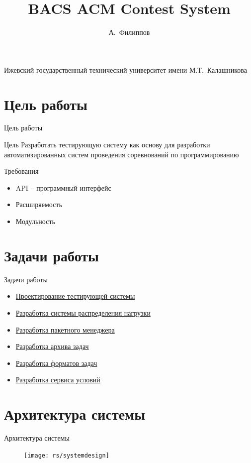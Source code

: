 \documentclass[xetex,mathserif,serif,10pt]{beamer}
\newenvironment{sframe}[2]{\section{#1}\begin{frame}[label=#2]{#1}}{\end{frame}}
\begin{document}
    \title[BACS]{BACS ACM Contest System}
    \author[Филиппов]{А.~Филиппов}
    \institute
    {
        Ижевский государственный технический университет имени М.Т.~Калашникова
    }

    

    \begin{sframe}{Цель работы}{target}
        \begin{block}{Цель}
            Разработать тестирующую систему как основу для разработки
            автоматизированных систем проведения соревнований по программированию
        \end{block}

        \begin{block}{Требования}
            \begin{itemize}
                \item API -- программный интерфейс
                \item Расширяемость
                \item Модульность
            \end{itemize}
        \end{block}
    \end{sframe}

    \begin{sframe}{Задачи работы}{problems}
        \begin{itemize}
            \item \hyperlink{systemdesign}{Проектирование тестирующей системы}
            \item \hyperlink{dcs}{Разработка системы распределения нагрузки}
            \item \hyperlink{bunsanpm}{Разработка пакетного менеджера}
            \item \hyperlink{bacsarchive}{Разработка архива задач}
            \item \hyperlink{bacsproblem}{Разработка форматов задач}
            \item \hyperlink{bacsstatementprovider}{Разработка сервиса условий}
        \end{itemize}
    \end{sframe}

    \begin{sframe}{Архитектура системы}{systemdesign}
        \begin{block}{}
            \begin{figure}[H]
                \centering
                \texttt{[image: rs/systemdesign]}
            \end{figure}
        \end{block}
    \end{sframe}
\end{document}
